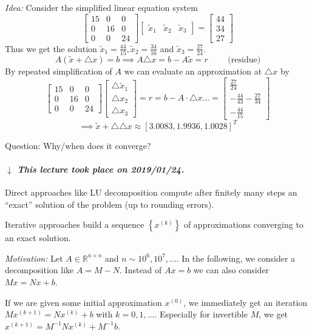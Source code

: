 \documentclass[a4paper]{article}
\numberwithin{lecref}{section}
\theoremstyle{break}
\newcommand{\dateref}[1]{%
  \begin{mdframed}[backgroundcolor=gray!10,innerbottommargin=0pt,innertopmargin=0pt]
    \paragraph{\textit{$\downarrow$ This lecture took place on #1.}}%
  \end{mdframed}%
}
\newcommand{\Set}[1]{\left\{#1\right\}}
\begin{document}
\emph{Idea:} Consider the simplified linear equation system
\[ \begin{bmatrix} 15 & 0 & 0 \\ 0 & 16 & 0 \\ 0 & 0 & 24 \end{bmatrix} \begin{bmatrix} \tilde x_1 & \tilde x_2 & \tilde x_3 \end{bmatrix} = \begin{bmatrix} 44 \\ 34 \\ 27 \end{bmatrix} \]
Thus we get the solution $\tilde x_1 = \frac{44}{15}, \tilde x_2 = \frac{34}{16}$ and $\tilde x_3 = \frac{27}{24}$.
\[ A(\tilde x + \triangle x) = b \implies A \triangle x = b - A \tilde x = r \qquad \text{ (residue)} \]
By repeated simplification of $A$ we can evaluate an approximation at $\triangle x$ by
\[ \begin{bmatrix} 15 & 0 & 0 \\ 0 & 16 & 0 \\ 0 & 0 & 24 \end{bmatrix} \begin{bmatrix} \triangle \tilde x_1 \\ \triangle x_2 \\ \triangle x_3 \end{bmatrix} = r = b - A \cdot \triangle x \dots = \begin{bmatrix} \frac{27}{24} \\ -\frac{44}{43} - \frac{27}{34} \\ -\frac{44}{15} \end{bmatrix} \]
\[ \implies \tilde x + \triangle \triangle x \approx [3.0083, 1.9936, 1.0028]^T \]

Question: Why/when does it converge?

\dateref{2019/01/24}

Direct approaches like LU decomposition compute after finitely many steps an \enquote{exact} solution of the problem (up to rounding errors).

Iterative approaches build a sequence $\Set{x^{(k)}}$ of approximations converging to an exact solution.

\emph{Motivation:} Let $A \in \mathbb R^{n\times n}$ and $n \sim 10^6, 10^7, \dots$.
In the following, we consider a decomposition like $A = M - N$.
Instead of $Ax = b$ we can also consider $Mx = Nx + b$.

If we are given some initial approximation $x^{(0)}$, we immediately get an iteration $M x^{(k+1)} = N x^{(k)} + b$ with $k = 0, 1, \dots$.
Especially for invertible $M$, we get $x^{(k+1)} = M^{-1} N x^{(k)} + M^{-1} b$.
\end{document}
